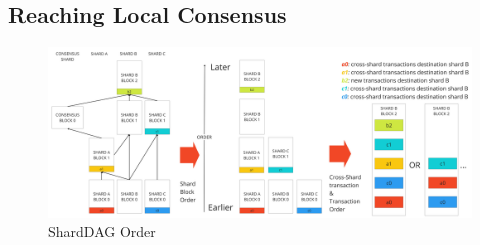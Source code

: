 \subsection{Reaching Local Consensus}

\begin{figure}
	\centering
	\includegraphics[width=1\linewidth]{figures/OrderExample}
	\caption{ShardDAG Order }
	\label{fig:order}
\end{figure}
